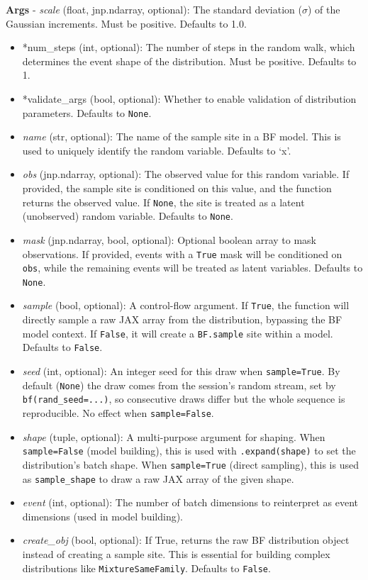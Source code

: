 \documentclass[
  letterpaper,
  DIV=11,
  numbers=noendperiod]{scrartcl}
\begin{document}
\textbf{Args} - \emph{scale} (float, jnp.ndarray, optional): The
standard deviation (\(\sigma\)) of the Gaussian increments. Must be
positive. Defaults to 1.0.

\begin{itemize}
\item
  *num\_steps (int, optional): The number of steps in the random walk,
  which determines the event shape of the distribution. Must be
  positive. Defaults to 1.
\item
  *validate\_args (bool, optional): Whether to enable validation of
  distribution parameters. Defaults to \texttt{None}.
\item
  \emph{name} (str, optional): The name of the sample site in a BF
  model. This is used to uniquely identify the random variable. Defaults
  to `x'.
\item
  \emph{obs} (jnp.ndarray, optional): The observed value for this random
  variable. If provided, the sample site is conditioned on this value,
  and the function returns the observed value. If \texttt{None}, the
  site is treated as a latent (unobserved) random variable. Defaults to
  \texttt{None}.
\item
  \emph{mask} (jnp.ndarray, bool, optional): Optional boolean array to
  mask observations. If provided, events with a \texttt{True} mask will
  be conditioned on \texttt{obs}, while the remaining events will be
  treated as latent variables. Defaults to \texttt{None}.
\item
  \emph{sample} (bool, optional): A control-flow argument. If
  \texttt{True}, the function will directly sample a raw JAX array from
  the distribution, bypassing the BF model context. If \texttt{False},
  it will create a \texttt{BF.sample} site within a model. Defaults to
  \texttt{False}.
\item
  \emph{seed} (int, optional): An integer seed for this draw when
  \texttt{sample=True}. By default (\texttt{None}) the draw comes from
  the session's random stream, set by \texttt{bf(rand\_seed=...)}, so
  consecutive draws differ but the whole sequence is reproducible. No
  effect when \texttt{sample=False}.
\item
  \emph{shape} (tuple, optional): A multi-purpose argument for shaping.
  When \texttt{sample=False} (model building), this is used with
  \texttt{.expand(shape)} to set the distribution's batch shape. When
  \texttt{sample=True} (direct sampling), this is used as
  \texttt{sample\_shape} to draw a raw JAX array of the given shape.
\item
  \emph{event} (int, optional): The number of batch dimensions to
  reinterpret as event dimensions (used in model building).
\item
  \emph{create\_obj} (bool, optional): If True, returns the raw BF
  distribution object instead of creating a sample site. This is
  essential for building complex distributions like
  \texttt{MixtureSameFamily}. Defaults to \texttt{False}.
\end{itemize}
\end{document}
